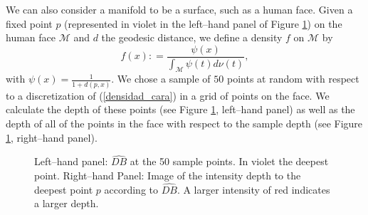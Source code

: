 \documentclass[a4paper]{article}
\def\defeq{\mathrel{\mathop:}=}
\numberwithin{equation}{section}
\def\defeq{\mathrel{\mathop:}=}
\begin{document}
We can also consider a manifold to be a surface, such as a human face. Given a fixed point $p$ (represented in violet in the left--hand panel of Figure \ref{cara1}) on the human face $\mathcal{M}$ and $d$ the geodesic distance, we define a density $f$ on $\mathcal{M} $ by
\begin{equation}
\label{densidad_cara}
f(x) \defeq \frac{\psi(x)}{ \int_{\mathcal{M}}  \psi(t) d \nu(t)},
\end{equation}
with $\psi(x)= \frac{1}{1+d(p,x)}$. We chose a sample of $50$ points at random with respect to a discretization of (\ref{densidad_cara}) in a grid of points on the face. We calculate the depth of these points (see Figure \ref{cara1}, left--hand panel) as well as the depth of all of the points in the face with respect to the sample depth (see Figure \ref{cara1}, right--hand panel).
\begin{figure}[!ht]
\centering
{}
\caption{Left--hand panel: $\widehat{DB}$ at the 50 sample points. In violet the deepest point. Right--hand Panel: Image of  the intensity depth to the deepest point $p$ according to $\widehat{DB}$. A larger intensity of red indicates a larger depth.} \label{cara1}  
\end{figure}
\end{document}
